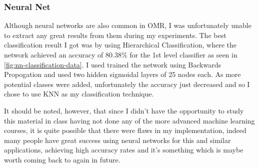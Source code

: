 \subsubsection{Neural Net}

Although neural networks are also common in OMR, I was unfortunately unable to extract any great results from them during my experiments. The best classification result I got was by using Hierarchical Classification, where the network achieved an accuracy of 80.38\% for the 1st level classifier as seen in \cref{fig:nn-classification-data}. I used trained the network using Backwards Propogation and used two hidden sigmoidal layers of 25 nodes each.
As more potential classes were added, unfortunately the accuracy just decreased and so I chose to use KNN as my classification technique.

It should be noted, however, that since I didn't have the opportunity to study this material in class having not done any of the more advanced machine learning courses, it is quite possible that there were flaws in my implementation, indeed many people have great success using neural networks for this and similar applications, achieving high accuracy rates and it's something which is maybe worth coming back to again in future.

